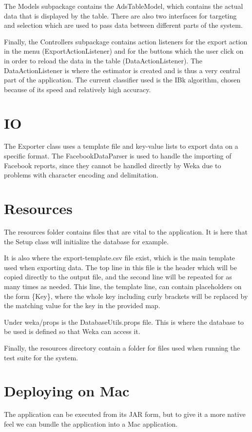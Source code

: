 \documentclass[11pt,twoside,a4paper]{article}
\begin{document}
The Models subpackage contains the AdsTableModel, which contains the actual data that is displayed by the table. There are also two interfaces for targeting and selection which are used to pass data between different parts of the system.

Finally, the Controllers subpackage contains action listeners for the export action in the menu (ExportActionListener) and for the buttons which the user click on in order to reload the data in the table (DataActionListener). The DataActionListener is where the estimator is created and is thus a very central part of the application. The current classifier used is the IBk algorithm, chosen because of its speed and relatively high accuracy.

\section{IO}
The Exporter class uses a template file and key-value lists to export data on a specific format. The FacebookDataParser is used to handle the importing of Facebook reports, since they cannot be handled directly by Weka due to problems with character encoding and delimitation.

\section{Resources}
The resources folder contains files that are vital to the application. It is here that the Setup class will initialize the database for example.

It is also where the export-template.csv file exist, which is the main template used when exporting data. The top line in this file is the header which will be copied directly to the output file, and the second line will be repeated for as many times as needed. This line, the template line, can contain placeholders on the form \{Key\}, where the whole key including curly brackets will be replaced by the matching value for the key in the provided map.

Under weka/props is the DatabaseUtils.props file. This is where the database to be used is defined so that Weka can access it.

Finally, the resources directory contain a folder for files used when running the test suite for the system.

\section{Deploying on Mac}
The application can be executed from its JAR form, but to give it a more native feel we can bundle the application into a Mac application.
\end{document}

